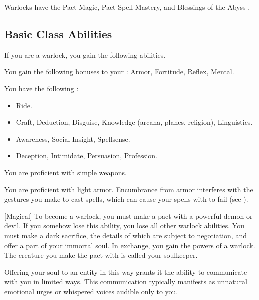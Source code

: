      Warlocks have the Pact Magic, Pact Spell Mastery, and Blessings of the Abyss .

    \subsection{Basic Class Abilities}
        If you are a warlock, you gain the following abilities.

        You gain the following bonuses to your :  Armor,  Fortitude,  Reflex,  Mental.

        You have the following :
        \begin{itemize}
            \item {} Ride.
            \item {} Craft, Deduction, Disguise, Knowledge (arcana, planes, religion), Linguistics.
            \item {} Awareness, Social Insight, Spellsense.
            \item {} Deception, Intimidate, Persuasion, Profession.
        \end{itemize}

        You are proficient with simple weapons.

        You are proficient with light armor.
        Encumbrance from armor interferes with the gestures you make to cast spells, which can cause your spells with  to fail (see ).

        [Magical]
        To become a warlock, you must make a pact with a powerful demon or devil.
        If you somehow lose this ability, you lose all other warlock abilities.
        You must make a dark sacrifice, the details of which are subject to negotiation, and offer a part of your immortal soul.
        In exchange, you gain the powers of a warlock.
        The creature you make the pact with is called your soulkeeper.

        Offering your soul to an entity in this way grants it the ability to communicate with you in limited ways.
        This communication typically manifests as unnatural emotional urges or whispered voices audible only to you.

